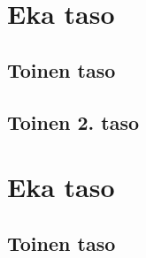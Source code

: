\documentclass{jamk}
\begin{document}
\makejamktitle

\tableofcontents
\listoffigures
\listoftables

\newpage

\section{Eka taso}
\lipsum[1]
\lipsum[2]

\subsection{Toinen taso}
\lipsum[1]
\lipsum[2]
\lipsum[3]
\lipsum[4]

\subsection{Toinen 2. taso}
\lipsum[1]
\lipsum[2]
\lipsum[3]

\section{Eka taso}
\lipsum[1]

\subsection{Toinen taso}
\lipsum[1]
\lipsum[2]
\lipsum[3]
\end{document}
